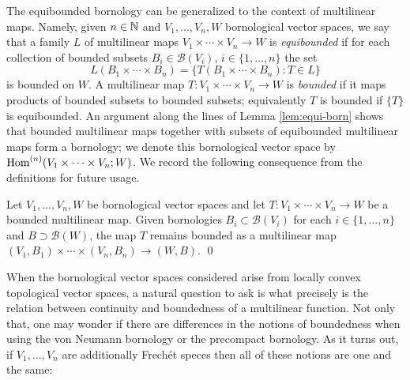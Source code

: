 
The equibounded bornology can be generalized to the context of multilinear maps. Namely, 
given $n \in \mathbb N$ and $V_1, \ldots, V_n, W$ bornological vector spaces, we say that a  
family $L$ of multilinear maps $V_1 \times \cdots \times V_n \to W$ is \emph{equibounded} if
for each collection of bounded subsets $B_i \in \mathcal B(V_i)$, $i \in \{1, \ldots, n\}$ the set
\[
  L(B_1 \times \cdots \times B_n) = \{T(B_1 \times \cdots \times B_n) : T \in L\}  
\]
is bounded on $W$. A multilinear map $T \colon V_1 \times \cdots \times V_n \to W$ is \emph{bounded}
if it maps products of bounded subsets to bounded subsets; equivalently $T$ is bounded if $\{T\}$ 
is equibounded. 
An argument along the lines of Lemma \ref{lem:equi-born} shows that
bounded multilinear maps together with subsets of equibounded
multilinear maps form a bornology; we denote this bornological vector space by
$\operatorname{Hom}^{(n)}(V_1 \times \cdots \times V_n; W)$.
We record the following consequence from the definitions for future usage.
\begin{lemma}\label{lem:bounded-coarsefine-mult}
Let $V_1, \ldots, V_n, W$ be bornological vector spaces and let
$T \colon V_1 \times \cdots \times V_n \to W$ be a bounded multilinear map.
Given bornologies $B_i \subset \mathcal B(V_i)$ 
for each $i \in \{1, \ldots,n\}$ and $B \supset \mathcal B(W)$, the map $T$ 
remains bounded as a multilinear map $(V_1, B_1) \times \cdots \times (V_n, B_n) \to (W,B)$.  
\qed
\end{lemma}

When the bornological vector spaces considered arise from 
locally convex topological vector spaces, 
a natural question to ask is 
what precisely is the relation between continuity and boundedness 
of a multilinear function. Not only that, one may wonder if there are differences
in the notions of boundedness 
when using the von Neumann bornology or the precompact bornology. 
As it turns out, if $V_1, \ldots, V_n$
are additionally Frechét speces then all of 
these notions are one and the same:

